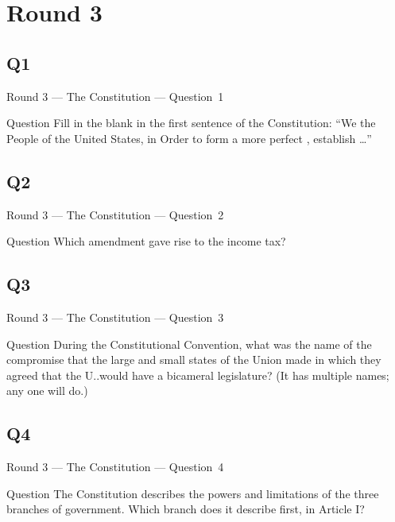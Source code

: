 \documentclass[11pt]{beamer}
\begin{document}
\section{Round 3}
\subsection*{Q1}
\begin{frame}[t]{Round 3 --- The Constitution --- \mbox{Question 1}}
\vspace{-0.5em}
\begin{block}{Question}
Fill in the blank in the first sentence of the Constitution: ``We the People of the United States, in Order to form a more perfect \textunderscore{}\textunderscore{}\textunderscore{}\textunderscore{}\textunderscore{}, establish \ldots{}''
\end{block}
\end{frame}
\subsection*{Q2}
\begin{frame}[t]{Round 3 --- The Constitution --- \mbox{Question 2}}
\vspace{-0.5em}
\begin{block}{Question}
Which amendment gave rise to the income tax?
\end{block}
\end{frame}
\subsection*{Q3}
\begin{frame}[t]{Round 3 --- The Constitution --- \mbox{Question 3}}
\vspace{-0.5em}
\begin{block}{Question}
During the Constitutional Convention, what was the name of the compromise that the large and small states of the Union made in which they agreed that the U.\@S.\@ would have a bicameral legislature? (It has multiple names; any one will do.)
\end{block}
\end{frame}
\subsection*{Q4}
\begin{frame}[t]{Round 3 --- The Constitution --- \mbox{Question 4}}
\vspace{-0.5em}
\begin{block}{Question}
The Constitution describes the powers and limitations of the three branches of government. Which branch does it describe first, in Article I\@?
\end{block}
\end{frame}
\end{document}
